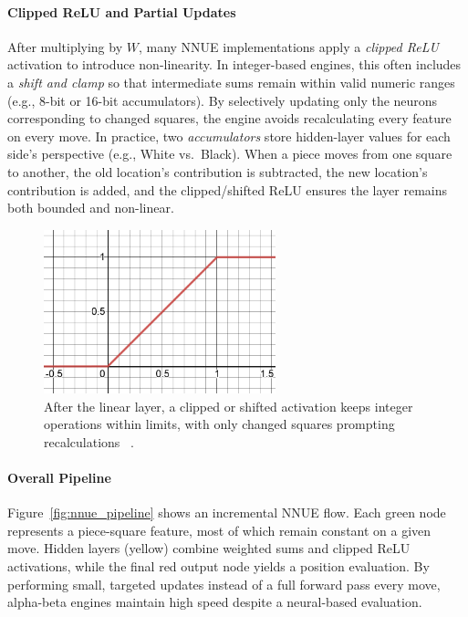 \documentclass[12pt,a4paper]{article}
\begin{document}
\paragraph{Clipped ReLU and Partial Updates}
After multiplying by \(W\), many NNUE implementations apply a \emph{clipped ReLU} 
activation to introduce non-linearity. In integer-based engines, this often includes 
a \emph{shift and clamp} so that intermediate sums remain within valid numeric ranges 
(e.g., 8-bit or 16-bit accumulators). By selectively updating only the neurons 
corresponding to changed squares, the engine avoids recalculating every feature on 
every move. In practice, two \emph{accumulators} store hidden-layer values for each 
side’s perspective (e.g., White vs.\ Black). When a piece moves from one square to 
another, the old location’s contribution is subtracted, the new location’s contribution 
is added, and the clipped/shifted ReLU ensures the layer remains both bounded and 
non-linear.



\begin{figure}[H]
    \centering
    \includegraphics[width=0.6\textwidth]{figures/clipped_relu.png}
    \caption{After the linear layer, a clipped or shifted activation keeps integer 
    operations within limits, with only changed squares prompting recalculations ~\cite{githubdocs}.}
    \label{fig:mvs}
\end{figure}

\paragraph{Overall Pipeline}
Figure~\ref{fig:nnue_pipeline} shows an incremental NNUE flow. Each green node represents a piece-square feature, most of which remain constant on a given move. Hidden layers (yellow) combine weighted sums and clipped ReLU activations, while the final red output node yields a position evaluation. By performing small, targeted updates instead of a full forward pass every move, alpha-beta engines maintain high speed despite a neural-based evaluation.
\end{document}
